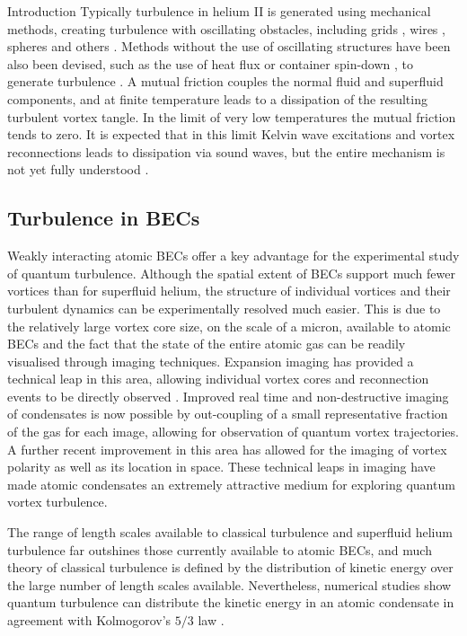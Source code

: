 \begin{chapter}{\label{cha:bose_gases}Introduction}
Typically turbulence in helium II is generated using mechanical methods, creating turbulence with oscillating obstacles, including grids \cite{Davis2000}, wires \cite{Guenault1986,Bradley2011,Fisher2001}, spheres \cite{Schoepe1995} and others \cite{Blaauwgeers2007,Bradley2012,Tabeling1998,Salort,VinenSkrbek2008}. Methods without the use of oscillating structures have been also been devised, such as the use of heat flux \cite{Vinen114} or container spin-down \cite{PhysRevLett.99.265302}, to generate turbulence . A mutual friction \cite{Donnelly} couples the normal fluid and superfluid components, and at finite temperature leads to a dissipation of the resulting turbulent vortex tangle. In the limit of very low temperatures the mutual friction tends to zero. It is expected that in this limit Kelvin wave excitations \cite{leadbeater,PhysRevA.69.053601} and vortex reconnections leads to dissipation via sound waves, but the entire mechanism is not yet fully understood \cite{PhysRevB.61.1410}.

\subsection{Turbulence in BECs}

Weakly interacting atomic BECs offer a key advantage for the experimental study of quantum turbulence. Although the spatial extent of BECs support much fewer vortices than for superfluid helium, the structure of individual vortices and their turbulent dynamics can be experimentally resolved much easier. This is due to the relatively large vortex core size, on the scale of a micron, available to atomic BECs and the fact that the state of the entire atomic gas can be readily visualised through imaging techniques. Expansion imaging has provided a technical leap in this area, allowing individual vortex cores and reconnection events to be directly observed \cite{PhysRevLett.84.806,Raman01,kwon_moon_14}. Improved real time and non-destructive imaging of condensates is now possible \cite{Freilich2010} by out-coupling of a small representative fraction of the gas for each image, allowing for observation of quantum vortex trajectories. A further recent improvement in this area \cite{powis} has allowed for the imaging of vortex polarity as well as its location in space. These technical leaps in imaging have made atomic condensates an extremely attractive medium for exploring quantum vortex turbulence. 

The range of length scales available to classical turbulence and superfluid helium turbulence far outshines those currently available to atomic BECs, and much theory of classical turbulence is defined by the distribution of kinetic energy over the large number of length scales available. Nevertheless, numerical studies show quantum turbulence can distribute the kinetic energy in an atomic condensate in agreement with Kolmogorov's $5/3$ law \cite{Nore,Kobayashi,PhysRevLett.103.084501}.


\end{chapter}
